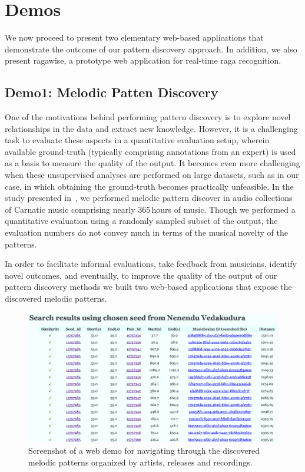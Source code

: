 \section{Demos}
\label{sec:demos}

We now proceed to present two elementary web-based applications that demonstrate the outcome of our pattern discovery approach. In addition, we also present \gls{ragawise}, a prototype web application for real-time \gls{raga} recognition. 

\subsection*{Demo1: Melodic Patten Discovery}

One of the motivations behind performing pattern discovery is to explore novel relationships in the data and extract new knowledge. However, it is a challenging task to evaluate these aspects in a quantitative evaluation setup, wherein available ground-truth (typically comprising annotations from an expert) is used as a basis to measure the quality of the output. It becomes even more challenging when these unsupervised analyses are performed on large datasets, such as in our case, in which obtaining the ground-truth becomes practically unfeasible. In the study presented in~\secref{}, we performed melodic pattern discover in audio collections of Carnatic music comprising nearly 365\,hours of music. Though we performed a quantitative evaluation using a randomly sampled subset of the output, the evaluation numbers do not convey much in terms of the musical novelty of the patterns. 

In order to facilitate informal evaluations, take feedback from musicians, identify novel outcomes, and eventually, to improve the quality of the output of our pattern discovery methods we built two web-based applications that expose the discovered melodic patterns. 

\begin{figure}
	\begin{center}
		\includegraphics[width=\figSizeHundred]{ch08_applications/figures/patternBrowsing1.png}
	\end{center}
	\caption[A web demo for navigating through the discovered melodic patterns]{Screenshot of a web demo for navigating through the discovered melodic patterns organized by artists, releases and recordings.}
	\label{fig:browser_patterns}
\end{figure}

